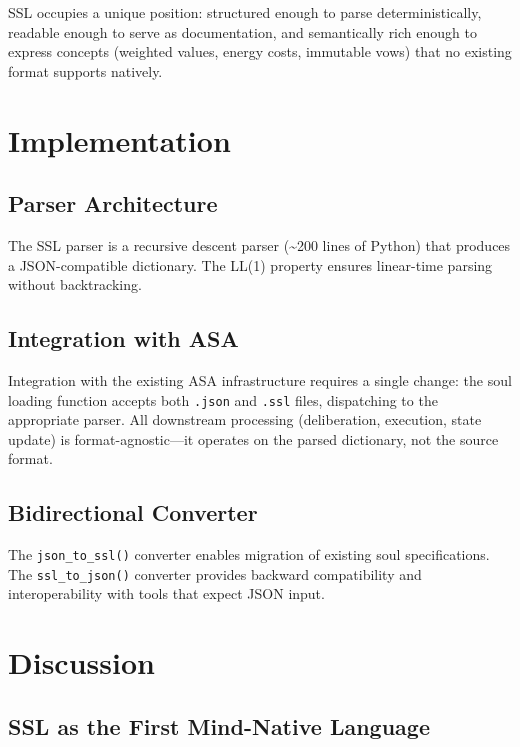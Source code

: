 \documentclass[12pt,a4paper]{article}
\theoremstyle{plain}
\theoremstyle{definition}
\theoremstyle{remark}
\begin{document}
SSL occupies a unique position: structured enough to parse deterministically, readable enough to serve as documentation, and semantically rich enough to express concepts (weighted values, energy costs, immutable vows) that no existing format supports natively.

\section{Implementation}

\subsection{Parser Architecture}

The SSL parser is a recursive descent parser (\~{}200 lines of Python) that produces a JSON-compatible dictionary. The LL(1) property ensures linear-time parsing without backtracking.

\subsection{Integration with ASA}

Integration with the existing ASA infrastructure requires a single change: the soul loading function accepts both \texttt{.json} and \texttt{.ssl} files, dispatching to the appropriate parser. All downstream processing (deliberation, execution, state update) is format-agnostic---it operates on the parsed dictionary, not the source format.

\subsection{Bidirectional Converter}

The \texttt{json\_to\_ssl()} converter enables migration of existing soul specifications. The \texttt{ssl\_to\_json()} converter provides backward compatibility and interoperability with tools that expect JSON input.

\section{Discussion}

\subsection{SSL as the First Mind-Native Language}
\end{document}
